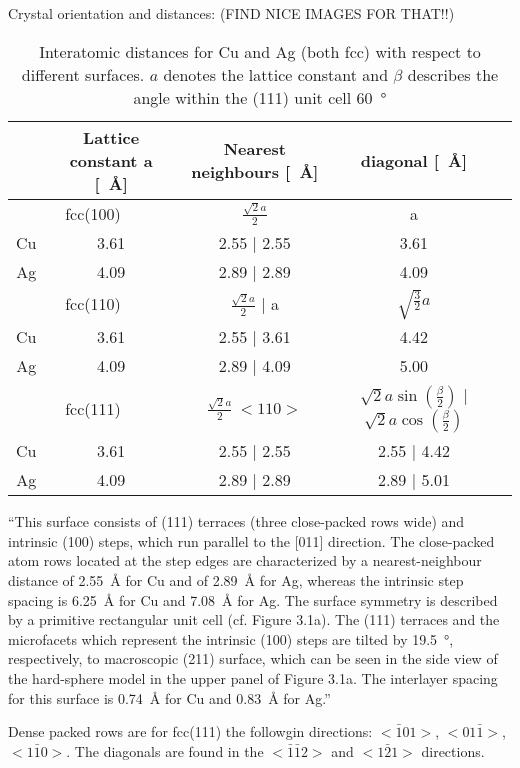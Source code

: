  Crystal orientation and distances: (FIND NICE IMAGES FOR THAT!!)
\begin{table}
\centering
\caption{Interatomic distances for Cu and Ag (both fcc) with respect to different surfaces. $a$ denotes the lattice constant and $\beta$ describes the angle within the (111) unit cell \SI{60}{\degree}}
  \begin{tabular}{ccccc}
& Lattice constant a [\SI{}{\angstrom}] & Nearest neighbours [\SI{}{\angstrom}] & diagonal [\SI{}{\angstrom}] \\ \hline \hline
\multicolumn{2}{c}{fcc(100)} & $\frac{\sqrt{2}a}{2}$ & a \\
  Cu	 	& 3.61	& 2.55 | 2.55 & 3.61 \\
  Ag		& 4.09	& 2.89 | 2.89 & 4.09 \\ \hline 
\multicolumn{2}{c}{fcc(110)} & $\frac{\sqrt{2}a}{2}$ | a & $\sqrt{\frac{3}{2}}a$\\
  Cu	 	& 3.61	& 2.55 | 3.61	& 4.42 \\
  Ag		& 4.09	& 2.89 | 4.09	& 5.00 \\ \hline 
\multicolumn{2}{c}{fcc(111)} & $\frac{\sqrt{2}a}{2} \ <110>$ & $\sqrt{2}a\sin(\frac{\beta}{2})$ | $\sqrt{2}a\cos(\frac{\beta}{2})$\\
  Cu 		& 3.61	& 2.55 | 2.55	& 2.55 | 4.42 \\
  Ag		& 4.09	& 2.89 | 2.89	& 2.89 | 5.01 \\ \hline
 \end{tabular}

\end{table}
 
 ``This surface consists of (111) terraces (three close-packed rows wide) and intrinsic (100) steps, which run parallel to the [011] direction. The close-packed atom rows located at the step edges are characterized by
a nearest-neighbour distance of \SI{2.55}{\angstrom}  for Cu and of \SI{2.89}{\angstrom} for Ag, whereas the intrinsic step
spacing is \SI{6.25}{\angstrom} for Cu and \SI{7.08}{\angstrom} for Ag. The surface symmetry is described by a primitive
rectangular unit cell (cf. Figure 3.1a). The (111) terraces and the microfacets which represent the intrinsic (100) steps are tilted by \SI{19.5}{\degree}, respectively, to macroscopic (211) surface, which can be seen in the side view of the hard-sphere model in the upper panel of Figure 3.1a. The interlayer spacing for this surface is \SI{0.74}{\angstrom} for Cu and \SI{0.83}{\angstrom} for Ag.''

Dense packed rows are for fcc(111) the followgin directions: $<\bar 1 01>$, $<01\bar 1>$, $<1\bar 1 0>$. The diagonals are found in the $<\bar 1 \bar 1 2>$ and $<1\bar 2 1>$ directions.

